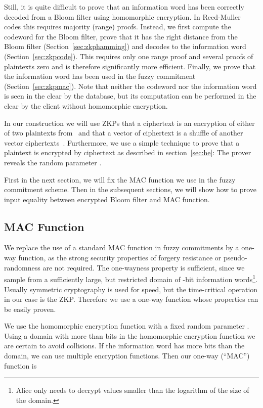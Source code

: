 \documentclass{llncs}
\begin{document}
Still, it is quite difficult to prove that an information word has been correctly decoded from a Bloom filter using homomorphic encryption.
In Reed-Muller codes this requires  majority (range) proofs.
Instead, we first compute the codeword  for the Bloom filter, prove that it has the right distance from the Bloom filter (Section~\ref{sec:zkphamming}) and decodes to the information word  (Section~\ref{sec:zkpcode}).
This requires only one range proof and several proofs of plaintexts zero and is therefore significantly more efficient.
Finally, we prove that the information word has been used in the fuzzy commitment (Section~\ref{sec:zkpmac}).
Note that neither the codeword nor the information word is seen in the clear by the database, but its computation can be performed in the clear by the client without homomorphic encryption.

In our construction we will use ZKPs that a ciphertext is an encryption of either of two plaintexts from~\cite{DamJur01} and that a vector of ciphertext is a shuffle of another vector ciphertexts~\cite{Gro10}.
Furthermore, we use a simple technique to prove that a plaintext  is encrypted by ciphertext  as described in section~\ref{sec:he}:
The prover reveals the random parameter .

First in the next section, we will fix the MAC function we use in the fuzzy commitment scheme.
Then in the subsequent sections, we will show how to prove input equality between encrypted Bloom filter and MAC function.

\subsection{MAC Function}
\label{sec:mac}

We replace the use of a standard MAC function in fuzzy commitments by a one-way function, as the strong security properties of forgery resistance or pseudo-randomness are not required. The one-wayness property is sufficient, since we sample from a sufficiently large, but restricted domain of -bit information words\footnote{Alice only needs to decrypt values smaller than the logarithm of the size of the domain.}.
Usually symmetric cryptography is used for speed, but the time-critical operation in our case is the ZKP.
Therefore we use a one-way function whose properties can be easily proven.

We use the homomorphic encryption function with a fixed random parameter .
Using a domain with more than  bits in the homomorphic encryption function we are certain to avoid collisions.
If the information word has more bits than the domain, we can use multiple encryption functions.
Then our one-way (``MAC'') function is
\end{document}
